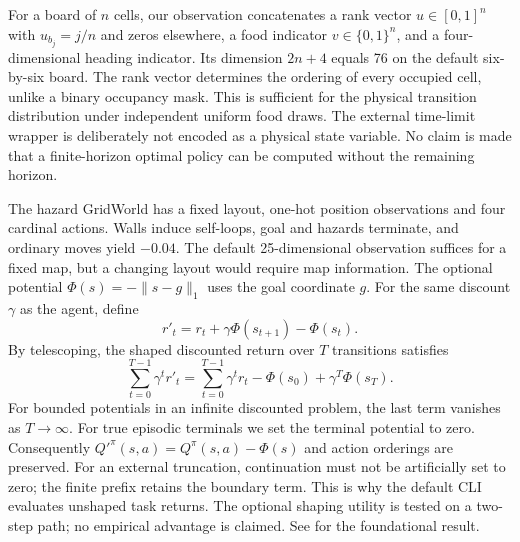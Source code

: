\documentclass[11pt,a4paper]{article}
\begin{document}
For a board of $n$ cells, our observation concatenates a rank vector
$u\in[0,1]^n$ with $u_{b_j}=j/n$ and zeros elsewhere, a food indicator
$v\in\{0,1\}^n$, and a four-dimensional heading indicator. Its dimension
$2n+4$ equals 76 on the default six-by-six board. The rank vector determines
the ordering of every occupied cell, unlike a binary occupancy mask. This
is sufficient for the physical transition distribution under independent
uniform food draws. The external time-limit wrapper is deliberately not
encoded as a physical state variable. No claim is made that a finite-horizon
optimal policy can be computed without the remaining horizon.

The hazard GridWorld has a fixed layout, one-hot position observations and
four cardinal actions. Walls induce self-loops, goal and hazards terminate,
and ordinary moves yield $-0.04$. The default 25-dimensional observation
suffices for a fixed map, but a changing layout would require map information.
The optional potential $\Phi(s)=-\|s-g\|_1$ uses the goal coordinate $g$.
For the same discount $\gamma$ as the agent, define
\[
 r'_t=r_t+\gamma\Phi(s_{t+1})-\Phi(s_t).
\]
By telescoping, the shaped discounted return over $T$ transitions satisfies
\[
 \sum_{t=0}^{T-1}\gamma^t r'_t
 =\sum_{t=0}^{T-1}\gamma^t r_t-\Phi(s_0)+\gamma^T\Phi(s_T).
\]
For bounded potentials in an infinite discounted problem, the last term
vanishes as $T\to\infty$. For true episodic terminals we set the terminal
potential to zero. Consequently $Q'^\pi(s,a)=Q^\pi(s,a)-\Phi(s)$ and action
orderings are preserved. For an external truncation, continuation must not
be artificially set to zero; the finite prefix retains the boundary term.
This is why the default CLI evaluates unshaped task returns. The optional
shaping utility is tested on a two-step path; no empirical advantage is
claimed. See \cite{ngshaping} for the foundational result.
\end{document}
